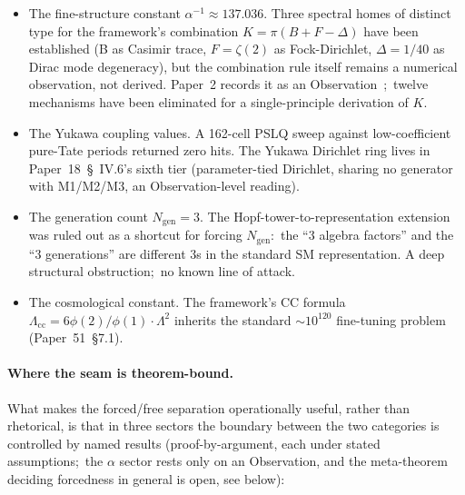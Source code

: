\documentclass[11pt,a4paper]{article}
\newcommand{\gvc}[2]{#2}
\begin{document}
\begin{itemize}
  \item The fine-structure constant $\alpha^{-1} \approx 137.036$.
    \gvc{k-combination-rule}{Three spectral homes of distinct type for the framework's combination
    $K = \pi(B + F - \Delta)$ have been established (B as Casimir
    trace, $F = \zeta(2)$ as Fock-Dirichlet, $\Delta = 1/40$ as
    Dirac mode degeneracy), but the combination rule itself remains
    a numerical observation, not derived}.  Paper~2 records it as an
    Observation~\cite{loutey_paper2};\ twelve mechanisms
    have been eliminated for a single-principle derivation of $K$.
  \item The Yukawa coupling values.  A 162-cell PSLQ sweep against
    low-coefficient pure-Tate periods returned zero hits.  The Yukawa Dirichlet ring lives
    in Paper~18~\S~IV.6's sixth tier (parameter-tied Dirichlet,
    sharing no generator with M1/M2/M3, an Observation-level reading).
  \item The generation count $N_{\mathrm{gen}} = 3$.  The
    Hopf-tower-to-representation extension was ruled out as a
    shortcut for forcing $N_{\mathrm{gen}}$:\ the ``3 algebra factors'' and the
    ``3 generations'' are different $3$s in the standard SM
    representation.  A deep structural obstruction;\ no known line
    of attack.
  \item The cosmological constant.  The framework's CC formula
    $\Lambda_{\mathrm{cc}} = 6\phi(2)/\phi(1) \cdot \Lambda^2$
    inherits the standard $\sim 10^{120}$ fine-tuning problem
    (Paper~51~\S7.1).
\end{itemize}

\paragraph{Where the seam is theorem-bound.}

What makes the forced/free separation operationally useful, rather
than rhetorical, is that in three sectors the boundary between the two
categories is controlled by named results (proof-by-argument, each
under stated assumptions;\ the $\alpha$ sector rests only on an Observation, and the
meta-theorem deciding forcedness in general is open, see below):
\end{document}
